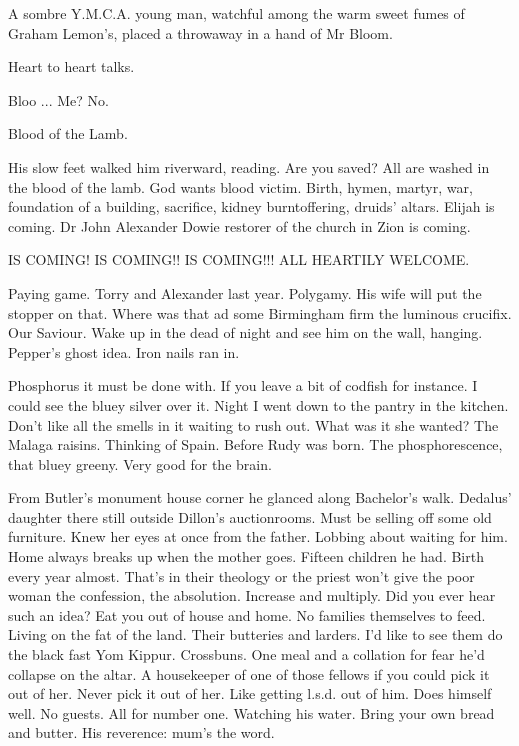 A sombre Y.M.C.A. young man,
watchful among the warm sweet fumes of Graham Lemon's,
placed a throwaway in a hand of Mr Bloom.

Heart to heart talks.

Bloo ...
Me?
No.

Blood of the Lamb.

His slow feet walked him riverward, reading.
Are you saved?
All are washed in the blood of the lamb.
God wants blood victim.
Birth, hymen, martyr, war,
foundation of a building,
sacrifice,
kidney burntoffering,
druids' altars.
Elijah is coming.
Dr John Alexander Dowie restorer of the church in Zion is coming.


    IS COMING! IS COMING!! IS COMING!!!
    ALL HEARTILY WELCOME.


Paying game.
Torry and Alexander last year.
Polygamy.
His wife will
put the stopper on that.
Where was that ad some Birmingham firm the
luminous crucifix.
Our Saviour.
Wake up in the dead of night and see him
on the wall, hanging.
Pepper's ghost idea.
Iron nails ran in.

Phosphorus it must be done with.
If you leave a bit of codfish for instance.
I could see the bluey silver over it.
Night I went down to the pantry in the kitchen.
Don't like all the smells in it waiting to rush out.
What was it she wanted?
The Malaga raisins.
Thinking of Spain.
Before Rudy was born.
The phosphorescence, that bluey greeny.
Very good for the brain.

From Butler's monument house corner
he glanced along Bachelor's walk.
Dedalus' daughter there still
outside Dillon's auctionrooms.
Must be selling off some old furniture.
Knew her eyes at once from the father.
Lobbing about waiting for him.
Home always breaks up when the mother goes.
Fifteen children he had.
Birth every year almost.
That's in their theology
or the priest won't give the poor woman
the confession,
the absolution.
Increase and multiply.
Did you ever hear such an idea?
Eat you out of house and home.
No families themselves to feed.
Living on the fat of the land.
Their butteries and larders.
I'd like to see them do the
black fast Yom Kippur.
Crossbuns.
One meal and a collation for fear he'd collapse on the altar.
A housekeeper of one of those fellows
if you could pick it out of her.
Never pick it out of her.
Like getting l.s.d. out of him.
Does himself well.
No guests.
All for number one.
Watching his water.
Bring your own bread and butter.
His reverence:
mum's the word.

